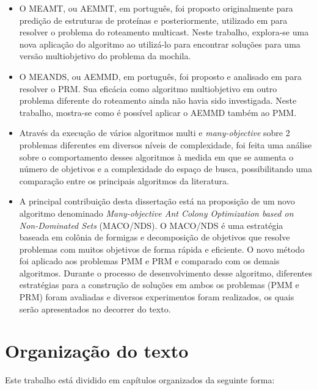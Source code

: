 \begin{itemize}  
	\item O \ac{MEAMT}, ou \ac{AEMMT}, em português, foi proposto originalmente para predição de estruturas de proteínas \cite{Brasil2013} e posteriormente, utilizado em  \cite{Lafeta2016} para resolver o problema do roteamento multicast. Neste trabalho, explora-se uma nova aplicação do algoritmo ao utilizá-lo para encontrar soluções para uma versão multiobjetivo do problema da mochila.
	\item O \ac{MEANDS}, ou \ac{AEMMD}, em português, foi proposto e analisado em \cite{Lafeta2016} para resolver o \ac{PRM}. Sua eficácia como algoritmo multiobjetivo em outro problema diferente do roteamento ainda não havia sido investigada. Neste trabalho, mostra-se como é possível aplicar o \ac{AEMMD} também ao \ac{PMM}.
	\item Através da execução de vários algoritmos multi e \textit{many-objective} sobre 2 problemas diferentes em diversos níveis de complexidade, foi feita uma análise sobre o comportamento desses algoritmos à medida em que se aumenta o número de objetivos e a complexidade do espaço de busca, possibilitando uma comparação entre os principais algoritmos da literatura.
	\item A principal contribuição desta dissertação está na proposição de um novo algoritmo denominado \textit{Many-objective Ant Colony Optimization based on Non-Dominated Sets} (MACO/NDS). O MACO/NDS é uma estratégia baseada em colônia de formigas e decomposição de objetivos que resolve problemas com muitos objetivos de forma rápida e eficiente. O novo método foi aplicado aos problemas \ac{PMM} e \ac{PRM} e comparado com os demais algoritmos. Durante o processo de desenvolvimento desse algoritmo, diferentes estratégias para a construção de soluções em ambos os problemas (PMM e PRM) foram avaliadas e diversos experimentos foram realizados, os quais serão apresentados no decorrer do texto.
\end{itemize}

\section{Organização do texto}
Este trabalho está dividido em capítulos organizados da seguinte forma:

